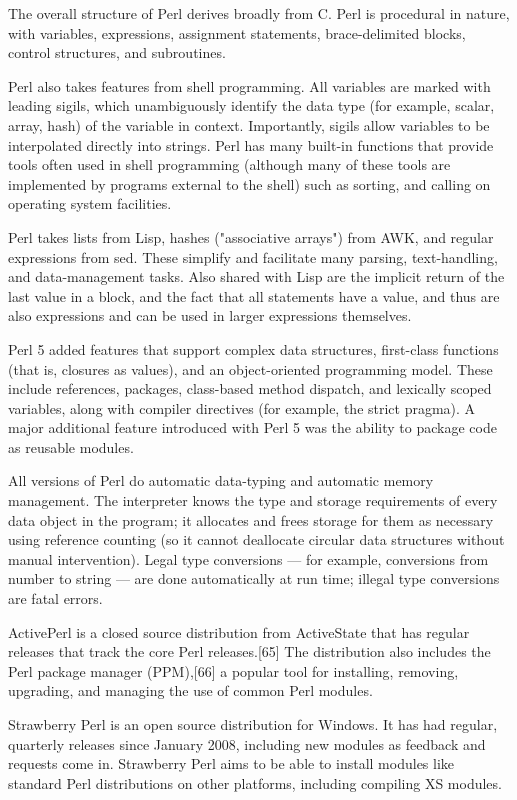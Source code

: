	\vpara
	The overall structure of Perl derives broadly from C. Perl is procedural in nature, with variables, expressions, assignment statements, brace-delimited blocks, control structures, and subroutines.
	
	\vpara
	Perl also takes features from shell programming. All variables are marked with leading sigils, which unambiguously identify the data type (for example, scalar, array, hash) of the variable in context. Importantly, sigils allow variables to be interpolated directly into strings. Perl has many built-in functions that provide tools often used in shell programming (although many of these tools are implemented by programs external to the shell) such as sorting, and calling on operating system facilities.
	
	\vpara
	Perl takes lists from Lisp, hashes ("associative arrays") from AWK, and regular expressions from sed. These simplify and facilitate many parsing, text-handling, and data-management tasks. Also shared with Lisp are the implicit return of the last value in a block, and the fact that all statements have a value, and thus are also expressions and can be used in larger expressions themselves.
	
	\vpara
	Perl 5 added features that support complex data structures, first-class functions (that is, closures as values), and an object-oriented programming model. These include references, packages, class-based method dispatch, and lexically scoped variables, along with compiler directives (for example, the strict pragma). A major additional feature introduced with Perl 5 was the ability to package code as reusable modules. 
	
	\vpara
	All versions of Perl do automatic data-typing and automatic memory management. The interpreter knows the type and storage requirements of every data object in the program; it allocates and frees storage for them as necessary using reference counting (so it cannot deallocate circular data structures without manual intervention). Legal type conversions — for example, conversions from number to string — are done automatically at run time; illegal type conversions are fatal errors.
	
	\vpara
	ActivePerl is a closed source distribution from ActiveState that has regular releases that track the core Perl releases.[65] The distribution also includes the Perl package manager (PPM),[66] a popular tool for installing, removing, upgrading, and managing the use of common Perl modules.
	
	\vpara
	Strawberry Perl is an open source distribution for Windows. It has had regular, quarterly releases since January 2008, including new modules as feedback and requests come in. Strawberry Perl aims to be able to install modules like standard Perl distributions on other platforms, including compiling XS modules.
	
